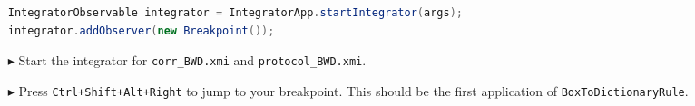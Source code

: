 \begin{enumerate}
\begin{lstlisting}[language=Java,backgroundcolor=\color{white}, keywordstyle={\bfseries\color{purple}}]
IntegratorObservable integrator = IntegratorApp.startIntegrator(args);
integrator.addObserver(new Breakpoint());
\end{lstlisting}

	\item[$\blacktriangleright$] Start the integrator for \texttt{corr\_BWD.xmi} and \texttt{protocol\_BWD.xmi}.
	\item[$\blacktriangleright$] Press \texttt{Ctrl+Shift+Alt+Right} to jump to your breakpoint.
	This should be the first application of \texttt{BoxToDictionaryRule}.

\end{enumerate}


